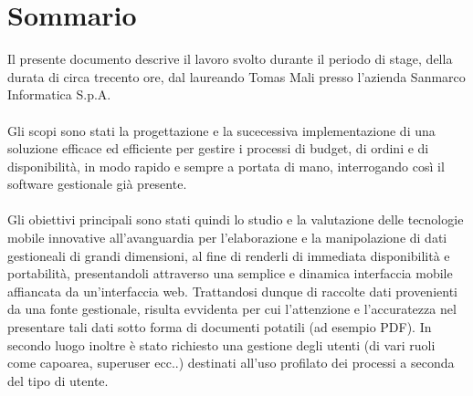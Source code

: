
\cleardoublepage
{}
{}
\begingroup
\let\clearpage\relax
\let\cleardoublepage\relax
\let\cleardoublepage\relax

\chapter*{Sommario}

Il presente documento descrive il lavoro svolto durante il periodo di stage, della durata di circa trecento ore, dal laureando Tomas Mali presso l'azienda Sanmarco Informatica S.p.A.\\ \\
Gli scopi sono stati la progettazione e la sucecessiva implementazione di una soluzione efficace ed efficiente per gestire i processi di budget, di ordini e di disponibilità, in modo rapido e sempre a portata di mano, interrogando così il software gestionale già presente.\\ \\

Gli obiettivi principali sono stati quindi lo studio e la valutazione delle tecnologie mobile innovative all'avanguardia per l'elaborazione e la manipolazione di dati gestioneali di grandi dimensioni, al fine di renderli di immediata disponibilità e portabilità, presentandoli attraverso una semplice e dinamica interfaccia mobile affiancata da un'interfaccia web. Trattandosi dunque di raccolte dati provenienti da una fonte gestionale, risulta evvidenta per cui l'attenzione e l'accuratezza nel presentare tali dati sotto forma di documenti potatili (ad esempio PDF).
In secondo luogo inoltre è stato richiesto una gestione degli utenti (di vari ruoli come capoarea, superuser ecc..) destinati all'uso profilato dei processi a seconda del tipo di utente.

%
%

\endgroup			

\vfill


